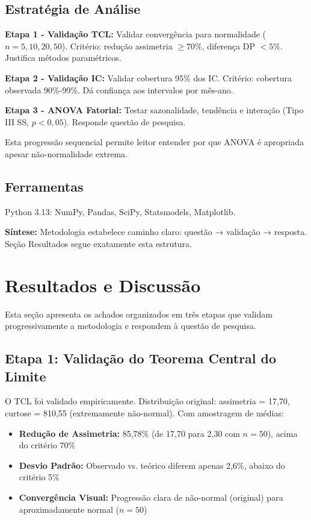 \documentclass[12pt,a4paper]{article}
\begin{document}
\subsection{Estratégia de Análise}

\textbf{Etapa 1 - Validação TCL:} Validar convergência para normalidade ($n = 5, 10, 20, 50$). Critério: redução assimetria $\geq 70\%$, diferença DP $< 5\%$. Justifica métodos paramétricos.

\textbf{Etapa 2 - Validação IC:} Validar cobertura 95\% dos IC. Critério: cobertura observada 90\%-99\%. Dá confiança aos intervalos por mês-ano.

\textbf{Etapa 3 - ANOVA Fatorial:} Testar sazonalidade, tendência e interação (Tipo III SS, $p < 0,05$). Responde questão de pesquisa.

Esta progressão sequencial permite leitor entender por que ANOVA é apropriada apesar não-normalidade extrema.

\subsection{Ferramentas}

Python 3.13: NumPy, Pandas, SciPy, Statsmodels, Matplotlib.



\textbf{Síntese:} Metodologia estabelece caminho claro: questão → validação → resposta. Seção Resultados segue exatamente esta estrutura.

\newpage
\section{Resultados e Discussão}

Esta seção apresenta os achados organizados em três etapas que validam progressivamente a metodologia e respondem à questão de pesquisa.

\subsection{Etapa 1: Validação do Teorema Central do Limite}

O TCL foi validado empiricamente. Distribuição original: assimetria = 17,70, curtose = 810,55 (extremamente não-normal). Com amostragem de médias:
\begin{itemize}
    \item \textbf{Redução de Assimetria:} 85,78\% (de 17,70 para 2,30 com $n=50$), acima do critério 70\%
    \item \textbf{Desvio Padrão:} Observado vs. teórico diferem apenas 2,6\%, abaixo do critério 5\%
    \item \textbf{Convergência Visual:} Progressão clara de não-normal (original) para aproximadamente normal ($n=50$)
\end{itemize}
\end{document}
